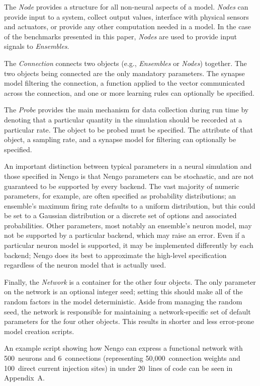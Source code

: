 \documentclass{frontiersSCNS}
\begin{document}
The \textit{Node} provides a structure for all
non-neural aspects of a model.
\textit{Nodes} can provide input to a system,
collect output values,
interface with physical sensors and actuators,
or provide any other computation needed in a model.
In the case of the benchmarks presented in this paper,
\textit{Nodes} are used to provide input signals
to \textit{Ensembles}.

The \textit{Connection} connects two objects
(e.g., \textit{Ensembles} or \textit{Nodes}) together.
The two objects being connected are the only mandatory parameters.
The synapse model filtering the connection,
a function applied to the vector
communicated across the connection,
and one or more learning rules
can optionally be specified.

The \textit{Probe} provides the main mechanism
for data collection during run time
by denoting that a particular
quantity in the simulation should be recorded
at a particular rate.
The object to be probed must be specified.
The attribute of that object,
a sampling rate, and a synapse model for filtering
can optionally be specified.

An important distinction between typical
parameters in a neural simulation
and those specified in Nengo
is that Nengo parameters can be stochastic,
and are not guaranteed
to be supported by every backend.
The vast majority of numeric parameters,
for example,
are often specified as probability distributions;
an ensemble's maximum firing rate defaults to
a uniform distribution,
but this could be set to a Gaussian distribution
or a discrete set of options and associated
probabilities.
Other parameters,
most notably an ensemble's neuron model,
may not be supported by a particular backend,
which may raise an error.
Even if a particular neuron model is supported,
it may be implemented differently by each backend;
Nengo does its best to approximate
the high-level specification regardless of
the neuron model that is actually used.

Finally, the \textit{Network} is a
container for the other four objects.
The only parameter on the network
is an optional integer seed;
setting this should make
all of the random factors
in the model deterministic.
Aside from managing the random seed,
the network is responsible for maintaining
a network-specific set of default parameters
for the four other objects.
This results in shorter and less error-prone
model creation scripts.

An example script showing how Nengo can
express a functional network
with 500~neurons and 6~connections
(representing 50,000~connection weights
and 100~direct current injection sites)
in under 20~lines of code
can be seen in Appendix~A.
\end{document}
